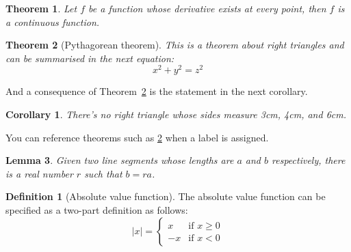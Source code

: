 \documentclass[]{report}
\newtheorem{theorem}{Theorem}[section]
\newtheorem{corollary}{Corollary}[theorem]
\newtheorem{lemma}[theorem]{Lemma}
\theoremstyle{definition}
\newtheorem{definition}{Definition}[section]
\begin{document}
\begin{theorem}
Let \(f\) be a function whose derivative exists at every point, then \(f\) is a continuous function.
\end{theorem}

\begin{theorem}[Pythagorean theorem]
\label{pythagorean}
This is a theorem about right triangles and can be summarised in the next equation:
\[
x^2 + y^2 = z^2
\]
\end{theorem}

And a consequence of Theorem~\ref{pythagorean} is the statement in the next corollary.

\begin{corollary}
There’s no right triangle whose sides measure 3cm, 4cm, and 6cm.
\end{corollary}

You can reference theorems such as \ref{pythagorean} when a label is assigned.

\begin{lemma}
Given two line segments whose lengths are \(a\) and \(b\) respectively, there is a real number \(r\) such that \(b = ra\).
\end{lemma}

\begin{definition}[Absolute value function]
The absolute value function can be specified as a two-part definition as follows:
\[
|x| =
\begin{cases}
x & \text{if } x \geq 0 \\
-x & \text{if } x < 0
\end{cases}
\]
\end{definition}
\end{document}
